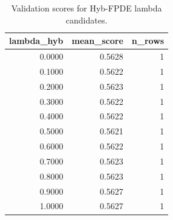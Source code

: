 \begin{table}[t]
\caption{Validation scores for Hyb-FPDE lambda candidates.}
\label{tab:lambda_distribution_computed}
\centering
\begin{tabular}{rrr}
\toprule
lambda\_hyb & mean\_score & n\_rows \\
\midrule
0.0000 & 0.5628 & 1 \\
0.1000 & 0.5622 & 1 \\
0.2000 & 0.5623 & 1 \\
0.3000 & 0.5622 & 1 \\
0.4000 & 0.5622 & 1 \\
0.5000 & 0.5621 & 1 \\
0.6000 & 0.5622 & 1 \\
0.7000 & 0.5623 & 1 \\
0.8000 & 0.5623 & 1 \\
0.9000 & 0.5627 & 1 \\
1.0000 & 0.5627 & 1 \\
\bottomrule
\end{tabular}

\end{table}
